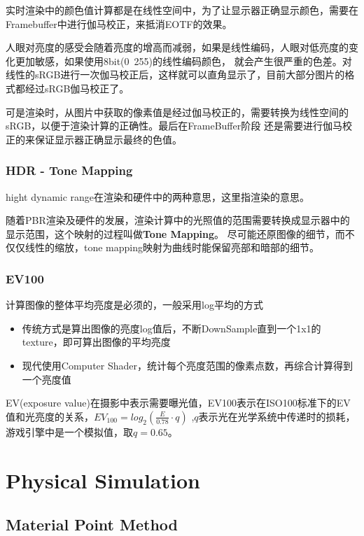 实时渲染中的颜色值计算都是在线性空间中，为了让显示器正确显示颜色，需要在Framebuffer中进行伽马校正，来抵消EOTF的效果。

人眼对亮度的感受会随着亮度的增高而减弱，如果是线性编码，人眼对低亮度的变化更加敏感，如果使用8bit(0~255)的线性编码颜色，
就会产生很严重的色差。对线性的sRGB进行一次伽马校正后，这样就可以直角显示了，目前大部分图片的格式都经过sRGB伽马校正了。

可是渲染时，从图片中获取的像素值是经过伽马校正的，需要转换为线性空间的sRGB，以便于渲染计算的正确性。最后在FrameBuffer阶段
还是需要进行伽马校正的来保证显示器正确显示最终的色值。

\subsection{HDR - Tone Mapping}
hight dynamic range在渲染和硬件中的两种意思，这里指渲染的意思。

随着PBR渲染及硬件的发展，渲染计算中的光照值的范围需要转换成显示器中的显示范围，这个映射的过程叫做\textbf{Tone Mapping}。
尽可能还原图像的细节，而不仅仅线性的缩放，tone mapping映射为曲线时能保留亮部和暗部的细节。

\subsection{EV100}

计算图像的整体平均亮度是必须的，一般采用log平均的方式

\begin{itemize}
    \item {传统方式是算出图像的亮度log值后，不断DownSample直到一个1x1的texture，即可算出图像的平均亮度}
    \item {现代使用Computer Shader，统计每个亮度范围的像素点数，再综合计算得到一个亮度值}
\end{itemize}

EV(exposure value)在摄影中表示需要曝光值，EV100表示在ISO100标准下的EV值和光亮度的关系，$EV_{100}=log_{2}(\frac{E}{0.78} \cdot q)$
,$q$表示光在光学系统中传递时的损耗，游戏引擎中是一个模拟值，取$q=0.65$。

\chapter{Physical Simulation}

\section{Material Point Method}


